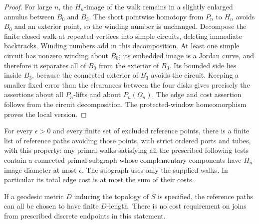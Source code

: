 \begin{proof}
For large $n$, the $H_n$-image of the walk remains in a slightly
enlarged annulus between $B_0$ and $B_3$.  The short pointwise
homotopy from $P_n$ to $H_n$ avoids $B_0$ and an exterior point,
so the winding number is unchanged.  Decompose the finite closed
walk at repeated vertices into simple circuits, deleting immediate
backtracks.  Winding numbers add in this decomposition.  At least
one simple circuit has nonzero winding about $B_0$; its embedded
image is a Jordan curve, and therefore it separates all of $B_0$
from the exterior of $B_3$.  Its bounded side lies inside $B_3$,
because the connected exterior of $B_3$ avoids the circuit.
Keeping a smaller fixed error than the clearances between the
four disks gives precisely the assertions about all $P_n$-lifts
and about $P_n(\Omega_n)$.  The edge and cost assertion follows
from the circuit decomposition.  The protected-window
homeomorphism proves the local version.
\end{proof}

\begin{lemma}
\label{top:separator-mesh}
For every $\epsilon>0$ and every finite set of excluded reference
points, there is a finite list of reference paths avoiding those
points, with strict ordered ports and tubes, with this property:
any primal walks satisfying all the prescribed following tests
contain a connected primal subgraph whose complementary components
have $H_n$-image diameter at most $\epsilon$.
The subgraph uses only the supplied walks.  In particular its
total edge cost is at most the sum of their costs.

If a geodesic metric $D$ inducing the topology of $S$ is specified,
the reference paths can all be chosen to have finite $D$-length.
There is no cost requirement on joins from prescribed discrete
endpoints in this statement.
\end{lemma}

